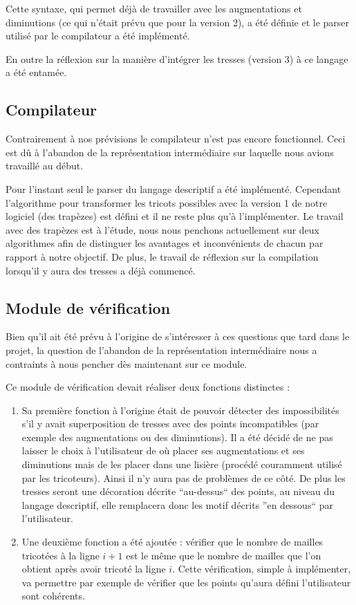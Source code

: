 \documentclass{article}
\begin{document}
Cette syntaxe, qui permet déjà de travailler avec les augmentations et diminutions (ce qui n'était prévu que pour la version 2), a été définie et le parser utilisé par le compilateur a été implémenté.

En outre la réflexion sur la manière d'intégrer les tresses (version 3) à ce langage a été entamée. %


\subsection{Compilateur}

Contrairement à nos prévisions le compilateur n'est pas encore fonctionnel. Ceci est dû à l'abandon de la représentation intermédiaire sur laquelle nous avions travaillé au début.

Pour l'instant seul le parser du langage descriptif a été implémenté. Cependant l'algorithme pour transformer les tricots possibles avec la version 1 de notre logiciel (des trapèzes) est défini et il ne reste plus qu'à l'implémenter. Le travail avec des trapèzes est à l'étude, nous nous penchons actuellement sur deux algorithmes afin de distinguer les avantages et inconvénients de chacun par rapport à notre objectif. %
De plus, le travail de réflexion sur la compilation lorsqu'il y aura des tresses a déjà commencé.

\subsection{Module de vérification}

Bien qu'il ait été prévu à l'origine de s'intéresser à ces questions que tard dans le projet, la question de l'abandon de la représentation intermédiaire nous a contraints à nous pencher dès maintenant sur ce module.

Ce module de vérification devait réaliser deux fonctions distinctes :

\begin{enumerate}
 \item Sa première fonction à l'origine était de pouvoir détecter des impossibilités s'il y avait superposition de tresses avec des points incompatibles (par exemple des augmentations ou des diminutions). Il a été décidé de ne pas laisser le choix à l'utilisateur de où placer ses augmentations et ses diminutions mais de les placer dans une lisière (procédé couramment utilisé par les tricoteurs). Ainsi il n'y aura pas de problèmes de ce côté. De plus les tresses seront une décoration décrite ``au-dessus`` des points, au niveau du langage descriptif, elle remplacera donc les motif décrits ''en dessous`` par l'utilisateur.

 \item Une deuxième fonction a été ajoutée : vérifier que le nombre de mailles tricotées à la ligne $i+1$ est le même que le nombre de mailles que l'on obtient après avoir tricoté la ligne $i$. Cette vérification, simple à implémenter, va permettre par exemple de vérifier que les points qu'aura défini l'utilisateur sont cohérents.
\end{enumerate}
\end{document}

